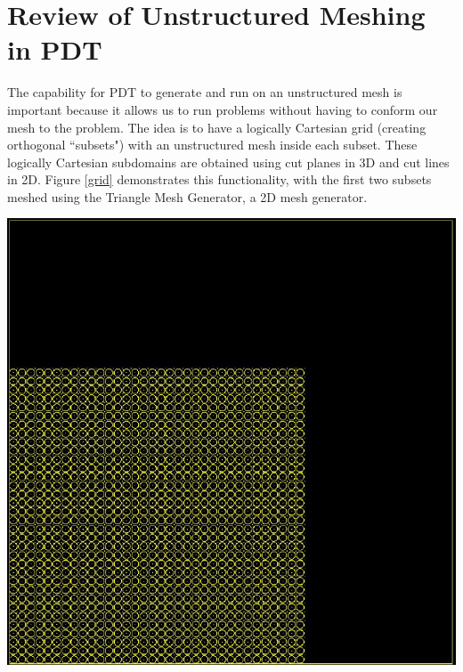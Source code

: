 \documentclass[11pt, letterpaper,titlepage,oneside]{article}
\begin{document}
\section{Review of Unstructured Meshing in PDT}

The capability for PDT to generate and run on an unstructured mesh is important because it allows us to run problems without having to conform our mesh to the problem. The idea is to have a logically Cartesian grid (creating orthogonal ``subsets") with an unstructured mesh inside each subset. These logically Cartesian subdomains are obtained using cut planes in 3D and cut lines in 2D. Figure \ref{grid} demonstrates this functionality, with the first two subsets meshed using the Triangle Mesh Generator\cite{triangle}, a 2D mesh generator. 

\noindent\begin{minipage}{\textwidth}
\centering
\includegraphics[scale = 0.5]{../figures/lattice.png}

\end{minipage}
\end{document}
